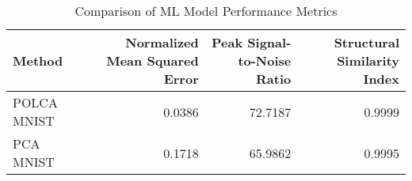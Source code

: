 \begin{table}[htbp]
\caption{Comparison of ML Model Performance Metrics}
\label{tab:model_comparison}
\begin{tabular}{lrrr}
\toprule
Method & Normalized Mean Squared Error & Peak Signal-to-Noise Ratio & Structural Similarity Index \\
\midrule
POLCA MNIST & 0.0386 & 72.7187 & 0.9999 \\
PCA MNIST & 0.1718 & 65.9862 & 0.9995 \\
\bottomrule
\end{tabular}
\end{table}
